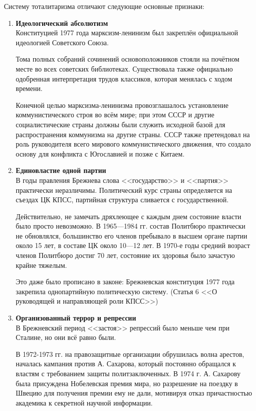 \documentclass[12pt]{article}
\begin{document}
  Систему тоталитаризма отличают следующие основные признаки:
  \begin{enumerate}[label=\textbf{\large\arabic*}]
    \item \textbf{Идеологический абсолютизм} \\
    Конституцией 1977 года марксизм-ленинизм был закреплён официальной идеологией Советского Союза.

    Тома полных собраний сочинений основоположников стояли на почётном месте во всех советских библиотеках.
    Существовала также официально одобренная интерпретация трудов классиков, которая менялась с ходом времени.

    Конечной целью марксизма-ленинизма провозглашалось установление коммунистического строя во всём мире;
    при этом СССР и другие социалистические страны должны были служить исходной базой для распространения коммунизма на другие страны.
    СССР также претендовал на роль руководителя всего мирового коммунистического движения,
    что создало основу для конфликта с Югославией и позже с Китаем.
    \item \textbf{Единовластие одной партии} \\
    В годы правления Брежнева слова <<государство>> и <<партия>> практически неразличимы.
    Политический курс страны определяется на съездах ЦК КПСС, партийная структура сливается с государственной.

    Действительно, не замечать дряхлеющее с каждым днем состояние власти было просто невозможно.
    В 1965—1984 гг. состав Политбюро практически не обновлялся,
    большинство его членов пребывало в высшем органе партии около 15 лет, в составе ЦК около 10—12 лет.
    В 1970-е годы средний возраст членов Политбюро достиг 70 лет, состояние их здоровья было зачастую крайне тяжелым.

    Это даже было прописано в законе:
    Брежневская конституция 1977 года закрепила однопартийную политическую систему.
    (Статья 6 <<О руководящей и направляющей роли КПСС>>)
    \item \textbf{Организованный террор и репрессии} \\
    В Брежневский период <<застоя>> репрессий было меньше чем при Сталине, но они всё равно были.

    В 1972-1973 гг. на правозащитные организации обрушилась волна арестов, началась кампания против А. Сахарова,
    который постоянно обращался к властям с требованием защиты политзаключенных.
    В 1974 г. А. Сахарову была присуждена Нобелевская премия мира,
    но разрешение на поездку в Швецию для получения премии ему не дали,
    мотивируя отказ причастностью академика к секретной научной информации.


\end{enumerate}
\end{document}
